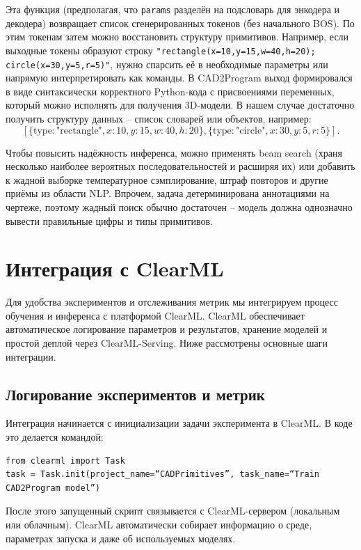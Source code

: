 \documentclass{article}
\begin{document}
Эта функция (предполагая, что \texttt{params} разделён на подсловарь для энкодера и декодера) возвращает список сгенерированных токенов (без начального BOS). По этим токенам затем можно восстановить структуру примитивов. Например, если выходные токены образуют строку \texttt{"rectangle(x=10,y=15,w=40,h=20); circle(x=30,y=5,r=5)"}, нужно спарсить её в необходимые параметры или напрямую интерпретировать как команды. В CAD2Program выход формировался в виде синтаксически корректного Python-кода с присвоениями переменных, который можно исполнять для получения 3D-модели. В нашем случае достаточно получить структуру данных – список словарей или объектов, например:
$$[ \{\text{type}: \text{"rectangle"}, x:10, y:15, w:40, h:20\}, \{\text{type}:\text{"circle"}, x:30, y:5, r:5\} ].$$

Чтобы повысить надёжность инференса, можно применять beam search (храня несколько наиболее вероятных последовательностей и расширяя их) или добавить к жадной выборке температурное сэмплирование, штраф повторов и другие приёмы из области NLP. Впрочем, задача детерминирована аннотациями на чертеже, поэтому жадный поиск обычно достаточен – модель должна однозначно вывести правильные цифры и типы примитивов.

\section{Интеграция с ClearML}

Для удобства экспериментов и отслеживания метрик мы интегрируем процесс обучения и инференса с платформой ClearML. ClearML обеспечивает автоматическое логирование параметров и результатов, хранение моделей и простой деплой через ClearML-Serving. Ниже рассмотрены основные шаги интеграции.

\subsection{Логирование экспериментов и метрик}

Интеграция начинается с инициализации задачи эксперимента в ClearML. В коде это делается командой:
\begin{lstlisting}
from clearml import Task
task = Task.init(project_name=“CADPrimitives”, task_name=“Train CAD2Program model”)
\end{lstlisting}
После этого запущенный скрипт связывается с ClearML-сервером (локальным или облачным). ClearML автоматически собирает информацию о среде, параметрах запуска и даже об используемых моделях.
\end{document}
